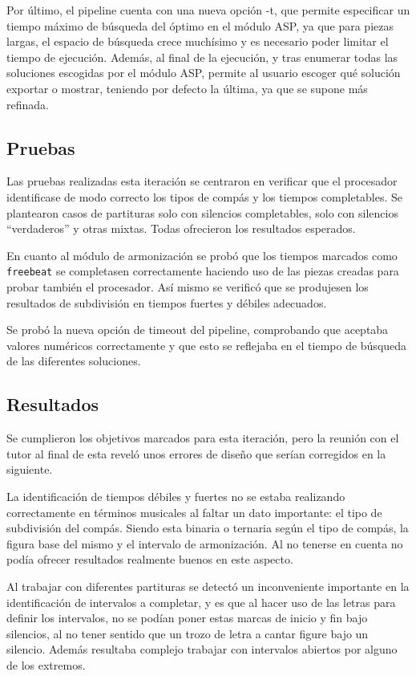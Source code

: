 Por último, el pipeline cuenta con una nueva opción -t, que permite especificar un tiempo máximo de búsqueda del óptimo en el módulo ASP, ya que para piezas largas, el espacio de búsqueda crece muchísimo y es necesario poder limitar el tiempo de ejecución. Además, al final de la ejecución, y tras enumerar todas las soluciones escogidas por el módulo ASP, permite al usuario escoger qué solución exportar o mostrar, teniendo por defecto la última, ya que se supone más refinada.

\subsection{Pruebas}
Las pruebas realizadas esta iteración se centraron en verificar que el procesador identificase de modo correcto los tipos de compás y los tiempos completables. Se plantearon casos de partituras solo con silencios completables, solo con silencios ``verdaderos'' y otras mixtas. Todas ofrecieron los resultados esperados.

En cuanto al módulo de armonización se probó que los tiempos marcados como \texttt{freebeat} se completasen correctamente haciendo uso de las piezas creadas para probar también el procesador. Así mismo se verificó que se produjesen los resultados de subdivisión en tiempos fuertes y débiles adecuados.

Se probó la nueva opción de timeout del pipeline, comprobando que aceptaba valores numéricos correctamente y que esto se reflejaba en el tiempo de búsqueda de las diferentes soluciones. 

\subsection{Resultados}
Se cumplieron los objetivos marcados para esta iteración, pero la reunión con el tutor al final de esta reveló unos errores de diseño que serían corregidos en la siguiente.

La identificación de tiempos débiles y fuertes no se estaba realizando correctamente en términos musicales al faltar un dato importante: el tipo de subdivisión del compás. Siendo esta binaria o ternaria según el tipo de compás, la figura base del mismo y el intervalo de armonización. Al no tenerse en cuenta no podía ofrecer resultados realmente buenos en este aspecto.

Al trabajar con diferentes partituras se detectó un inconveniente importante en la identificación de intervalos a completar, y es que al hacer uso de las letras para definir los intervalos, no se podían poner estas marcas de inicio y fin bajo silencios, al no tener sentido que un trozo de letra a cantar figure bajo un silencio. Además resultaba complejo trabajar con intervalos abiertos por alguno de los extremos.

